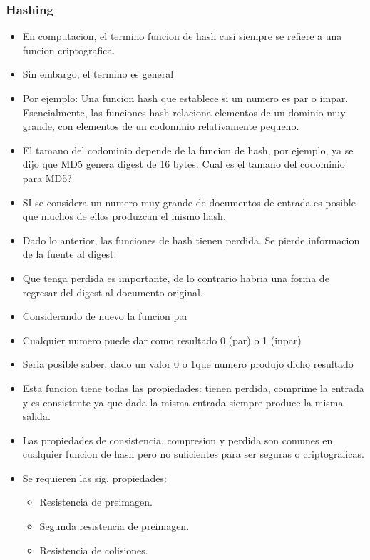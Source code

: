 \documentclass[11pt]{article}
\begin{document}
\subsubsection{Hashing}
\label{sec:org86349ef}
\begin{itemize}
\item En computacion, el termino funcion de hash casi siempre se refiere a una funcion criptografica.
\item Sin embargo, el termino es general
\item Por ejemplo: Una funcion hash que establece si un numero es par o impar. Esencialmente, las funciones hash relaciona elementos de un dominio muy grande, con elementos de un codominio relativamente pequeno.
\item El tamano del codominio depende de la funcion de hash, por ejemplo, ya se dijo que MD5 genera digest de 16 bytes. Cual es el tamano del codominio para MD5?
\item SI se considera un numero muy grande de documentos de entrada es posible que muchos de ellos produzcan el mismo hash.
\item Dado lo anterior, las funciones de hash tienen perdida. Se pierde informacion de la fuente al digest.
\item Que tenga perdida es importante, de lo contrario habria una forma de regresar del digest al documento original.
\item Considerando de nuevo la funcion par
\item Cualquier numero puede dar como resultado 0 (par) o 1 (inpar)
\item Seria posible saber, dado un valor 0 o 1que numero produjo dicho resultado
\item Esta funcion tiene todas las propiedades: tienen perdida, comprime la entrada y es consistente ya que dada la misma entrada siempre produce la misma salida.

\item Las propiedades de consistencia, compresion y perdida son comunes en cualquier funcion de hash pero no suficientes para ser seguras o criptograficas.
\item Se requieren las sig. propiedades:
\begin{itemize}
\item Resistencia de preimagen.
\item Segunda resistencia de preimagen.
\item Resistencia de colisiones.
\end{itemize}
\end{itemize}
\end{document}

